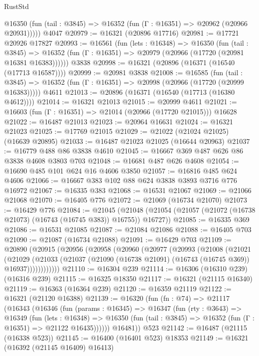 \begin{lexlean}{RustStd}
\begin{coremodule}
      @16350 (fun (tail : @3845) => @16352 (fun (Γ : @16351) => @20962 (@20966 @20931)))))
    @4047
@20979 := @16321 (@20896 @17716)
@20981 := @17721 @20926 @17827
@20993 := @16561
    (fun (lets : @16348) =>
    @16350
      (fun (tail : @3845) =>
      @16352 (fun (Γ : @16351) => @20979 (@20966 (@17720 (@20981 @16381 @16383))))))
    @3838
@20998 := @16321 (@20896 (@16371 (@16540 (@17713 @16587))))
@20999 := @20981 @3838
@21008 := @16585
    (fun (tail : @3845) => @16352 (fun (Γ : @16351) => @20998 (@20966 (@17720 (@20999 @16383)))))
    @4611
@21013 := @20896 (@16371 (@16540 (@17713 (@16380 @4612))))
@21014 := @16321 @21013
@21015 := @20999 @4611
@21021 := @16603 (fun (Γ : @16351) => @21014 (@20966 (@17720 @21015))) @16628
@21022 := @16487 @21013
@21023 := @20964 @16631
@21024 := @16321 @21023
@21025 := @17769 @21015
@21029 := @21022 (@21024 @21025) (@16639 @20895)
@21033 := @16487 @21023 @21025 (@16644 @20963)
@21037 := @16779 @488 @86 @3838 @4610
@21045 := @16667 @369 @487 @626 @86 @3838 @4608 @3803 @703
@21048 := @16681 @487 @626 @4608
@21054 := @16690 @485 @101 @624 @16 @4606 @3850
@21057 := @16816 @485 @624 @4606
@21066 := @16667 @383 @102 @88 @624 @3838 @3893 @3716 @776 @16972
@21067 := @16335 @383
@21068 := @16531 @21067
@21069 := @21066 @21068
@21070 := @16405 @776
@21072 := @21069 (@16734 @21070)
@21073 := @16429 @776
@21084 := @21045
    (@21048 (@21054 (@21057 (@21072 (@16738 @21073) (@16743 (@16745 @383)) @16755)) @16727))
@21085 := @16335 @369
@21086 := @16531 @21085
@21087 := @21084 @21086
@21088 := @16405 @703
@21090 := @21087 (@16734 @21088)
@21091 := @16429 @703
@21109 := @20890
    (@20915
      (@20956
        (@20958
          (@20960
            (@20977
              (@20993
                (@21008
                  (@21021
                    (@21029
                      (@21033
                        (@21037 (@21090 (@16738 @21091) (@16743 (@16745 @369)) @16937))))))))))))
@21110 := @16304 @239
@21114 := @16306 (@16310 @239) (@16316 @239)
@21115 := @16325 @18350
@21117 := @16321 (@21115 @16340)
@21119 := @16363 (@16364 @239)
@21120 := @16359 @21119
@21122 := @16321 (@21120 @16388)
@21139 := @16320
    (fun (fn : @74) =>
    @21117
      (@16343
        (@16346
          (fun (params : @16345) =>
          @16347
            (fun (rty : @3643) =>
            @16349
              (fun (lets : @16348) =>
              @16350 (fun (tail : @3845) => @16352 (fun (Γ : @16351) => @21122 @16435))))))
        @16481))
    @523
@21142 := @16487 (@21115 (@16338 @523))
@21145 := @16400 (@16401 @523) @18353
@21149 := @16321 (@16392 (@21145 @16409) @16413)

\end{coremodule}
\end{lexlean}
